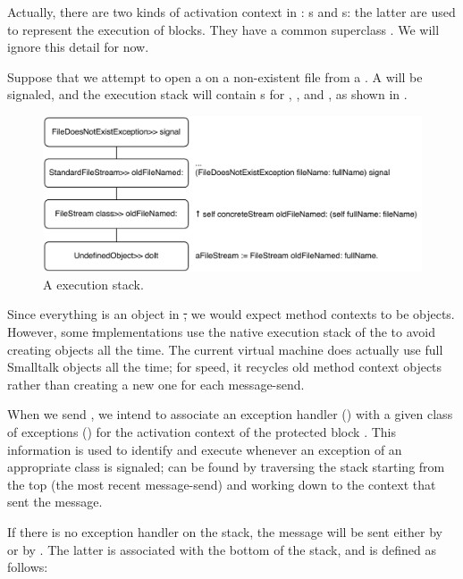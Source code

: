\documentclass[a4paper,10pt,twoside]{book}
\begin{document}
Actually, there are two kinds of activation context in \pharo: s and s: the latter are used to represent the execution of blocks.  They have a common superclass .  We will ignore this detail for now.

Suppose that we attempt to open a  on a non-existent file from a .
A  will be signaled, and the execution stack will contain s for , , and , as shown in .

\begin{figure}[bth]\centering
        \includegraphics[width=\linewidth]{Stack}
        \caption{A \pharo execution stack.}
\end{figure}

Since everything is an object in \st, we would expect method contexts to be objects.
However, some \st implementations use the native  execution stack of the  to avoid creating objects all the time.
The current \pharo virtual machine does actually use full Smalltalk objects all the time;  for speed, it recycles old method context objects rather than creating a new one for each message-send.

When we send , we intend to associate an exception handler () with a given class of exceptions () for the activation context of the protected block .
This information is used to identify and execute  whenever an exception of an appropriate class is signaled;  can be found by traversing the stack starting from the top (the most recent message-send) and working down to the context that sent the  message.

If there is no exception handler on the stack, the message  will be sent either by  or by . The latter is associated with the bottom of the stack, and is defined as follows:
\end{document}
